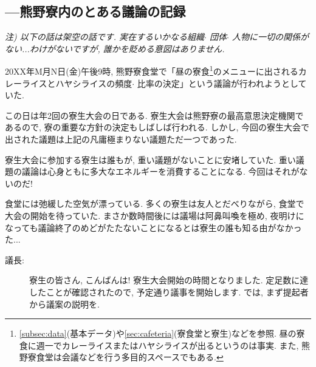 \documentclass[10pt,b5jsbook,dvips,dvipdfmx,openany]{jsbook}
\theoremstyle{definition}
\begin{document}
		\begin{multicols}{2}

		\subsection{---熊野寮内のとある議論の記録}
		\small
		\emph{注) 以下の話は架空の話です. 実在するいかなる組織$ \cdot $ 団体$ \cdot $ 人物に一切の関係がない...わけがないですが, 誰かを貶める意図はありません. }

		20XX年M月N日(金)午後9時, 熊野寮食堂で「昼の寮食\footnote{\ref{subsec:data}(基本データ)や\ref{sec:cafeteria}(寮食堂と寮生)などを参照. 昼の寮食に週一でカレーライスまたはハヤシライスが出るというのは事実. また, 熊野寮食堂は会議などを行う多目的スペースでもある. }のメニューに出されるカレーライスとハヤシライスの頻度$ \cdot $ 比率の決定」という議論が行われようとしていた. 

		この日は年2回の寮生大会の日である. 寮生大会は熊野寮の最高意思決定機関であるので, 寮の重要な方針の決定もしばしば行われる. しかし, 今回の寮生大会で出された議題は上記の凡庸極まりない議題ただ一つであった. 

		寮生大会に参加する寮生は誰もが, 重い議題がないことに安堵していた. 重い議題の議論は心身ともに多大なエネルギーを消費することになる. 今回はそれがないのだ! 

		食堂には弛緩した空気が漂っている. 多くの寮生は友人とだべりながら, 食堂で大会の開始を待っていた. まさか数時間後には議場は阿鼻叫喚を極め, 夜明けになっても議論終了のめどがたたないことになるとは寮生の誰も知る由がなかった...

		\begin{description}

		\item[議長: ] 寮生の皆さん, こんばんは! 寮生大会開始の時間となりました. 定足数に達したことが確認されたので, 予定通り議事を開始します. では, まず提起者から議案の説明を. 


\end{description}
\end{multicols}
\end{document}
